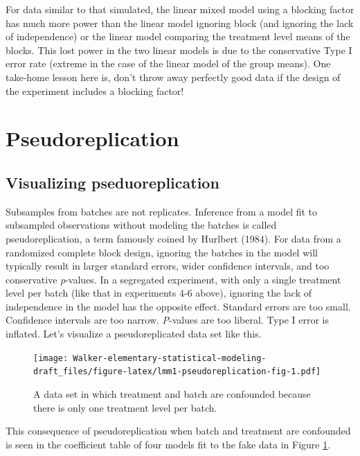 \documentclass[]{book}
\begin{document}
For data similar to that simulated, the linear mixed model using a blocking factor has much more power than the linear model ignoring block (and ignoring the lack of independence) or the linear model comparing the treatment level means of the blocks. This lost power in the two linear models is due to the conservative Type I error rate (extreme in the case of the linear model of the group means). One take-home lesson here is, don't throw away perfectly good data if the design of the experiment includes a blocking factor!

\hypertarget{pseudoreplication}{%
\section{Pseudoreplication}\label{pseudoreplication}}

\hypertarget{visualizing-pseduoreplication}{%
\subsection{Visualizing pseduoreplication}\label{visualizing-pseduoreplication}}

Subsamples from batches are not replicates. Inference from a model fit to subsampled observations without modeling the batches is called pseudoreplication, a term famously coined by Hurlbert (1984). For data from a randomized complete block design, ignoring the batches in the model will typically result in larger standard errors, wider confidence intervals, and too conservative \emph{p}-values. In a segregated experiment, with only a single treatment level per batch (like that in experiments 4-6 above), ignoring the lack of independence in the model has the opposite effect. Standard errors are too small. Confidence intervals are too narrow. \emph{P}-values are too liberal. Type I error is inflated. Let's visualize a pseudoreplicated data set like this.

\begin{figure}
\centering
\texttt{[image: Walker-elementary-statistical-modeling-draft\_files/figure-latex/lmm1-pseudoreplication-fig-1.pdf]}
\caption{\label{fig:lmm1-pseudoreplication-fig}A data set in which treatment and batch are confounded because there is only one treatment level per batch.}
\end{figure}

This consequence of pseudoreplication when batch and treatment are confounded is seen in the coefficient table of four models fit to the fake data in Figure \ref{fig:lmm1-pseudoreplication-fig}.
\end{document}
